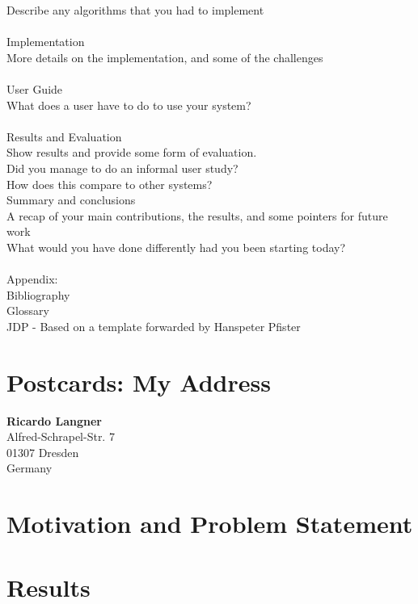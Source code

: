     Describe any algorithms that you had to implement \\
\\
Implementation \\
    More details on the implementation, and some of the challenges \\
\\
User Guide \\
    What does a user have to do to use your system? \\
\\
Results and Evaluation \\
    Show results and provide some form of evaluation. \\
    Did you manage to do an informal user study? \\
    How does this compare to other systems? \\

Summary and conclusions \\
   A recap of your main contributions, the results, and some pointers for future work \\
   What would you have done differently had you been starting today? \\
\\
Appendix: \\
   Bibliography \\
   Glossary \\

JDP - Based on a template forwarded by Hanspeter Pfister



\section{Postcards: My Address}
\label{sec:intro:address}

\textbf{Ricardo Langner} \\
Alfred-Schrapel-Str. 7 \\
01307 Dresden \\
Germany


\section{Motivation and Problem Statement}
\label{sec:intro:motivation}

\Blindtext[3][1] \cite{Jurgens:2000,Jurgens:1995,Miede:2011,Kohm:2011,Apple:keynote:2010,Apple:numbers:2010,Apple:pages:2010}

\section{Results}
\label{sec:intro:results}

